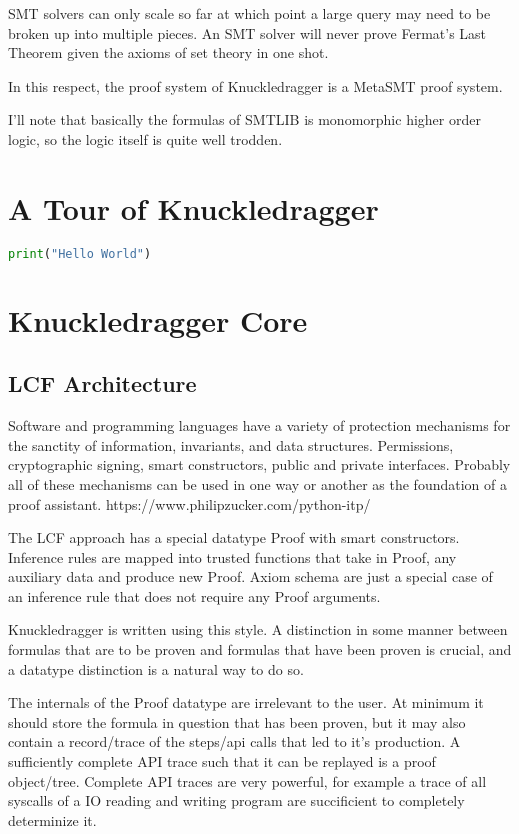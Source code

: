 \documentclass{article}%
\begin{document}
SMT solvers can only scale so far at which point a large query may need to be broken up into multiple pieces. An SMT solver will never prove Fermat’s Last Theorem given the axioms of set theory in one shot.

In this respect, the proof system of Knuckledragger is a MetaSMT proof system.

I’ll note that basically the formulas of SMTLIB is monomorphic higher order logic, so the logic itself is quite well trodden.


\section{A Tour of Knuckledragger}

\begin{lstlisting}[language=Python, caption=Example]
    print("Hello World")
\end{lstlisting}

\section{Knuckledragger Core}

\subsection{LCF Architecture}
Software and programming languages have a variety of protection mechanisms for the sanctity of information, invariants, and data structures. Permissions, cryptographic signing, smart constructors, public and private interfaces. Probably all of these mechanisms can be used in one way or another as the foundation of a proof assistant. https://www.philipzucker.com/python-itp/

The LCF approach has a special datatype Proof with smart constructors. Inference rules are mapped into trusted functions that take in Proof, any auxiliary data and produce new Proof. Axiom schema are just a special case of an inference rule that does not require any Proof arguments.

Knuckledragger is written using this style. A distinction in some manner between formulas that are to be proven and formulas that have been proven is crucial, and a datatype distinction is a natural way to do so.

The internals of the Proof datatype are irrelevant to the user. At minimum it should store the formula in question that has been proven, but it may also contain a record/trace of the steps/api calls that led to it’s production. A sufficiently complete API trace such that it can be replayed is a proof object/tree. Complete API traces are very powerful, for example a trace of all syscalls of a IO reading and writing program are succificient to completely determinize it.
\end{document}
